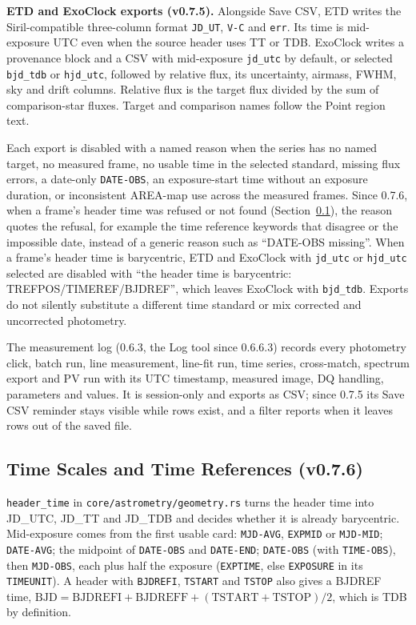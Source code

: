 \documentclass[11pt,a4paper]{article}
\newcommand{\code}[1]{\texttt{\small #1}}
\begin{document}
    \textbf{ETD and ExoClock exports (v0.7.5).} Alongside Save CSV, ETD writes the Siril-compatible three-column format \code{JD\_UT}, \code{V-C} and \code{err}. Its time is mid-exposure UTC even when the source header uses TT or TDB. ExoClock writes a provenance block and a CSV with mid-exposure \code{jd\_utc} by default, or selected \code{bjd\_tdb} or \code{hjd\_utc}, followed by relative flux, its uncertainty, airmass, FWHM, sky and drift columns. Relative flux is the target flux divided by the sum of comparison-star fluxes. Target and comparison names follow the Point region text.

    Each export is disabled with a named reason when the series has no named target, no measured frame, no usable time in the selected standard, missing flux errors, a date-only \code{DATE-OBS}, an exposure-start time without an exposure duration, or inconsistent AREA-map use across the measured frames. Since 0.7.6, when a frame's header time was refused or not found (Section~\ref{sec:time_scales}), the reason quotes the refusal, for example the time reference keywords that disagree or the impossible date, instead of a generic reason such as ``DATE-OBS missing''. When a frame's header time is barycentric, ETD and ExoClock with \code{jd\_utc} or \code{hjd\_utc} selected are disabled with ``the header time is barycentric: TREFPOS/TIMEREF/BJDREF'', which leaves ExoClock with \code{bjd\_tdb}. Exports do not silently substitute a different time standard or mix corrected and uncorrected photometry.

    The measurement log (0.6.3, the Log tool since 0.6.6.3) records every photometry click, batch run, line measurement, line-fit run, time series, cross-match, spectrum export and PV run with its UTC timestamp, measured image, DQ handling, parameters and values. It is session-only and exports as CSV; since 0.7.5 its Save CSV reminder stays visible while rows exist, and a filter reports when it leaves rows out of the saved file.

    \subsection{Time Scales and Time References (v0.7.6)}
    \label{sec:time_scales}

    \code{header\_time} in \code{core/astrometry/geometry.rs} turns the header time into JD\_UTC, JD\_TT and JD\_TDB and decides whether it is already barycentric. Mid-exposure comes from the first usable card: \code{MJD-AVG}, \code{EXPMID} or \code{MJD-MID}; \code{DATE-AVG}; the midpoint of \code{DATE-OBS} and \code{DATE-END}; \code{DATE-OBS} (with \code{TIME-OBS}), then \code{MJD-OBS}, each plus half the exposure (\code{EXPTIME}, else \code{EXPOSURE} in its \code{TIMEUNIT}). A header with \code{BJDREFI}, \code{TSTART} and \code{TSTOP} also gives a BJDREF time, $\text{BJD} = \text{BJDREFI} + \text{BJDREFF} + (\text{TSTART} + \text{TSTOP})/2$, which is TDB by definition.
\end{document}
